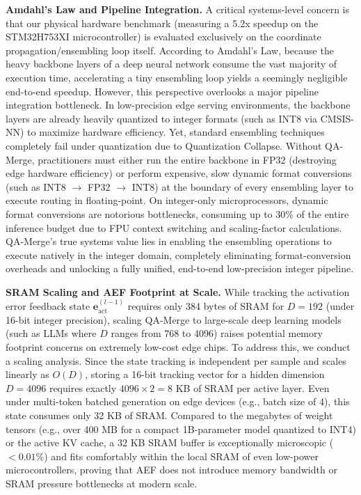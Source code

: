 \documentclass{article}
\theoremstyle{plain}
\theoremstyle{definition}
\theoremstyle{remark}
\begin{document}
\textbf{Amdahl's Law and Pipeline Integration.} A critical systems-level concern is that our physical hardware benchmark (measuring a 5.2x speedup on the STM32H753XI microcontroller) is evaluated exclusively on the coordinate propagation/ensembling loop itself. According to Amdahl's Law, because the heavy backbone layers of a deep neural network consume the vast majority of execution time, accelerating a tiny ensembling loop yields a seemingly negligible end-to-end speedup. 
However, this perspective overlooks a major pipeline integration bottleneck. In low-precision edge serving environments, the backbone layers are already heavily quantized to integer formats (such as INT8 via CMSIS-NN) to maximize hardware efficiency. Yet, standard ensembling techniques completely fail under quantization due to Quantization Collapse. Without QA-Merge, practitioners must either run the entire backbone in FP32 (destroying edge hardware efficiency) or perform expensive, slow dynamic format conversions (such as INT8 $\rightarrow$ FP32 $\rightarrow$ INT8) at the boundary of every ensembling layer to execute routing in floating-point. 
On integer-only microprocessors, dynamic format conversions are notorious bottlenecks, consuming up to $30\%$ of the entire inference budget due to FPU context switching and scaling-factor calculations. QA-Merge's true systems value lies in enabling the ensembling operations to execute natively in the integer domain, completely eliminating format-conversion overheads and unlocking a fully unified, end-to-end low-precision integer pipeline.

\textbf{SRAM Scaling and AEF Footprint at Scale.} While tracking the activation error feedback state $\mathbf{e}_{\text{act}}^{(l-1)}$ requires only 384 bytes of SRAM for $D=192$ (under 16-bit integer precision), scaling QA-Merge to large-scale deep learning models (such as LLMs where $D$ ranges from 768 to 4096) raises potential memory footprint concerns on extremely low-cost edge chips. 
To address this, we conduct a scaling analysis. Since the state tracking is independent per sample and scales linearly as $O(D)$, storing a 16-bit tracking vector for a hidden dimension $D=4096$ requires exactly $4096 \times 2 = 8$ KB of SRAM per active layer. Even under multi-token batched generation on edge devices (e.g., batch size of 4), this state consumes only 32 KB of SRAM. Compared to the megabytes of weight tensors (e.g., over 400 MB for a compact 1B-parameter model quantized to INT4) or the active KV cache, a 32 KB SRAM buffer is exceptionally microscopic ($<0.01\%$) and fits comfortably within the local SRAM of even low-power microcontrollers, proving that AEF does not introduce memory bandwidth or SRAM pressure bottlenecks at modern scale.
\end{document}
